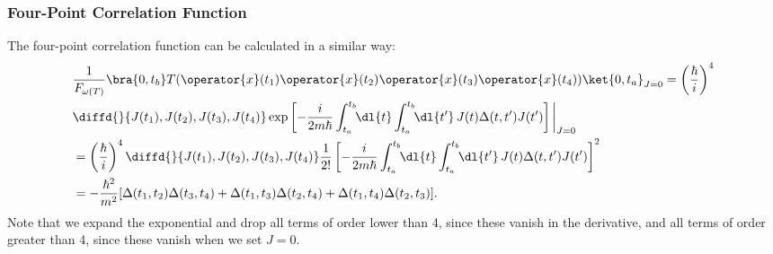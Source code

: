 \documentclass[fleqn]{NotesClass}
\newcommand*{\timeorder}{T}
\begin{document}
    \subsubsection{Four-Point Correlation Function}
    The four-point correlation function can be calculated in a similar way:
    \begin{align}
        &\frac{1}{F_{\omega(T)}}\bra{0, t_b} \timeorder(\operator{x}(t_1)\operator{x}(t_2)\operator{x}(t_3)\operator{x}(t_4)) \ket{0, t_a}_{J=0} = \left( \frac{\hbar}{i} \right)^{4}\\
        &\diffd{}{J(t_1),J(t_2),J(t_3),J(t_4)} \exp\left[ -\frac{i}{2m\hbar} \int_{t_a}^{t_b} \!\! \dl{t} \int_{t_a}^{t_b} \!\! \dl{t'} \, J(t)\Delta(t, t')J(t') \right] \bigg\vert_{J=0}\notag\\
        &= \left( \frac{\hbar}{i} \right)^{4} \diffd{}{J(t_1),J(t_2),J(t_3),J(t_4)} \frac{1}{2!}\left[ -\frac{i}{2m\hbar} \int_{t_a}^{t_b} \!\! \dl{t} \int_{t_a}^{t_b} \!\! \dl{t'} \, J(t)\Delta(t, t')J(t') \right]^2\notag\\
        &= -\frac{\hbar^2}{m^2} [\Delta(t_1, t_2) \Delta(t_3, t_4) + \Delta(t_1, t_3)\Delta(t_2, t_4) + \Delta(t_1, t_4)\Delta(t_2, t_3)].
    \end{align}
    Note that we expand the exponential and drop all terms of order lower than 4, since these vanish in the derivative, and all terms of order greater than 4, since these vanish when we set \(J = 0\).
    
\end{document}
